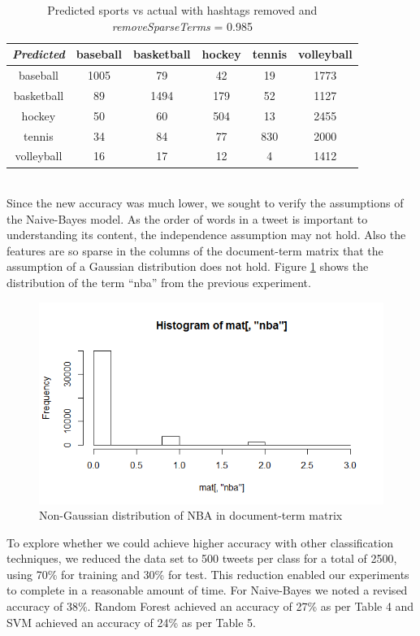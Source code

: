 \documentclass[journal, a4paper]{IEEEtran}
\begin{document}
\begin{table}[ht]
	\begin{center}
		\begin{tabular}{|c|c c c c c|}
			\hline
			\textit{Predicted}& baseball & basketball & hockey & tennis& volleyball\\
			\hline
			baseball &1005&79&42&19&1773\\
			basketball & 89 & 1494& 179 & 52 & 1127\\
			hockey &50&60&504&13&2455\\
			tennis &34&84&77&830&2000\\
			volleyball& 16 & 17 & 12 & 4&1412\\
			\hline
		\end{tabular}
	\end{center}
	\caption{Predicted sports vs actual with hashtags removed and \textit{removeSparseTerms} = 0.985}\label{Tab:3}
\end{table}\\
Since the new accuracy was much lower, we sought to verify the assumptions of the Naive-Bayes model. As the order of words in a tweet is important to understanding its content, the independence assumption may not hold. Also the features are so sparse in the columns of the document-term matrix that the assumption of a Gaussian distribution does not hold. Figure \ref{fig:1} shows the distribution of the term “nba” from the previous experiment.
\begin{figure}[!hbt]
	\centering
	\includegraphics[width=\columnwidth]{image00.png}
	\caption{Non-Gaussian distribution of NBA in document-term matrix}
	\label{fig:1}
\end{figure}
To explore whether we could achieve higher accuracy with other classification techniques, we reduced the data set to 500 tweets per class for a total of 2500, using 70\% for training and 30\% for test. This reduction enabled our experiments to complete in a reasonable amount of time. For Naive-Bayes we noted a revised accuracy of 38\%. Random Forest achieved an accuracy of 27\% as per Table 4 and SVM achieved an accuracy of 24\% as per Table 5.
\end{document}
